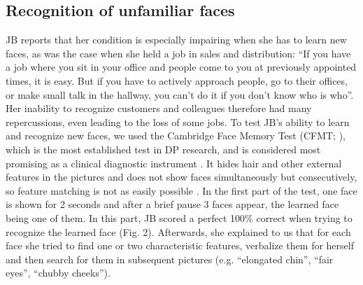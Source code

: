 \documentclass[fleqn,10pt]{SelfArx} %
\begin{document}
\subsection*{Recognition of unfamiliar faces}

JB reports that her condition is especially impairing when she has to learn new faces, as was the case when she held a job in sales and distribution: “If you have a job where you sit in your office and people come to you at previously appointed times, it is easy. But if you have to actively approach people, go to their offices, or make small talk in the hallway, you can't do it if you don't know who is who”. Her inability to recognize customers and colleagues therefore had many repercussions, even leading to the loss of some jobs.
To test JB's ability to learn and recognize new faces, we used the Cambridge Face Memory Test (CFMT; \citet{Duchaine_2006cfmt}), which is the most established test in DP research, and is considered most promising as a clinical diagnostic instrument \citep{Susilo_2013, Towler_2017}. It hides hair and other external features in the pictures and does not show faces simultaneously but consecutively, so feature matching is not as easily possible \citep{Duchaine_2006cfmt}. In the first part of the test, one face is shown for 2 seconds and after a brief pause 3 faces appear, the learned face being one of them. In this part, JB scored a perfect 100\% correct when trying to recognize the learned face (Fig. 2). Afterwards, she explained to us that for each face she tried to find one or two characteristic features, verbalize them for herself and then search for them in subsequent pictures (e.g. “elongated chin”, “fair eyes”, “chubby cheeks”).
\end{document}
